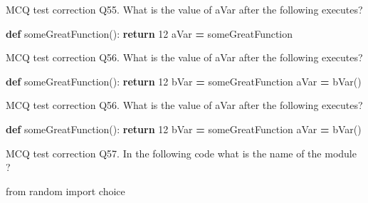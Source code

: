 \documentclass[
  8pt,
  ignorenonframetext,
]{beamer}
\newenvironment{Shaded}{\begin{snugshade}}{\end{snugshade}}
\newcommand{\ControlFlowTok}[1]{\textcolor[rgb]{0.13,0.29,0.53}{\textbf{#1}}}
\newcommand{\DecValTok}[1]{\textcolor[rgb]{0.00,0.00,0.81}{#1}}
\newcommand{\ImportTok}[1]{#1}
\newcommand{\KeywordTok}[1]{\textcolor[rgb]{0.13,0.29,0.53}{\textbf{#1}}}
\newcommand{\NormalTok}[1]{#1}
\newcommand{\OperatorTok}[1]{\textcolor[rgb]{0.81,0.36,0.00}{\textbf{#1}}}
\begin{document}
\begin{frame}[fragile]{MCQ test correction}
\protect\hypertarget{mcq-test-correction-109}{}
Q55. What is the value of aVar after the following executes?

\begin{Shaded}
\begin{Highlighting}[]
\KeywordTok{def}\NormalTok{ someGreatFunction():}
    \ControlFlowTok{return} \DecValTok{12}
\NormalTok{aVar }\OperatorTok{=}\NormalTok{ someGreatFunction}
\end{Highlighting}
\end{Shaded}
\end{frame}

\begin{frame}[fragile]{MCQ test correction}
\protect\hypertarget{mcq-test-correction-110}{}
Q56. What is the value of aVar after the following executes?

\begin{Shaded}
\begin{Highlighting}[]
\KeywordTok{def}\NormalTok{ someGreatFunction():}
    \ControlFlowTok{return} \DecValTok{12}
\NormalTok{bVar }\OperatorTok{=}\NormalTok{ someGreatFunction}
\NormalTok{aVar }\OperatorTok{=}\NormalTok{ bVar()}
\end{Highlighting}
\end{Shaded}
\end{frame}

\begin{frame}[fragile]{MCQ test correction}
\protect\hypertarget{mcq-test-correction-111}{}
Q56. What is the value of aVar after the following executes?

\begin{Shaded}
\begin{Highlighting}[]
\KeywordTok{def}\NormalTok{ someGreatFunction():}
    \ControlFlowTok{return} \DecValTok{12}
\NormalTok{bVar }\OperatorTok{=}\NormalTok{ someGreatFunction}
\NormalTok{aVar }\OperatorTok{=}\NormalTok{ bVar()}
\end{Highlighting}
\end{Shaded}
\end{frame}

\begin{frame}[fragile]{MCQ test correction}
\protect\hypertarget{mcq-test-correction-112}{}
Q57. In the following code what is the name of the module ?

\begin{Shaded}
\begin{Highlighting}[]
\ImportTok{from}\NormalTok{ random }\ImportTok{import}\NormalTok{ choice}
\end{Highlighting}
\end{Shaded}
\end{frame}
\end{document}
